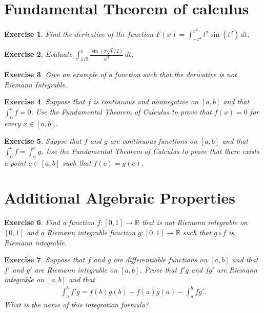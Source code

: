 \documentclass[12pt]{article}
\newcommand{\bR}{\mathbb{R}}
\newcommand{\ra}{\rightarrow}
\theoremstyle{plain}
\newtheorem{exer}{\textbf{Exercise}}}
\theoremstyle{plain}
\theoremstyle{plain}
\theoremstyle{plain}
\begin{document}
\section{Fundamental Theorem of calculus}
\begin{exer}
Find the derivative of the function $F(x) =\int_{-x^4}^{x^2} t^2 \sin (t^2) \, dt$.
\end{exer}

\begin{exer}
Evaluate $\int_{1/9}^1 \frac{\sin (\pi \sqrt{t}/2 )}{\sqrt{t}} \, dt$.
\end{exer}
	
\begin{exer}
Give an example of a function such that the derivative is not Riemann Integrable.
\end{exer}

\begin{exer}
Suppose that $f$ is continuous and nonnegative on $[a, b]$ and that $\int_a^b f = 0$. Use the Fundamental Theorem of Calculus to prove that $f(x) = 0$ for every $x \in [a, b]$.
\end{exer}

\begin{exer}
Suppse that $f$ and $g$ are continuous functions on $[a, b]$ and that $\int_a^b f = \int_a^b g$. Use the Fundamental Theorem of Calculus to prove that there exists a point $c \in [a, b]$ such that $f(c) = g(c)$.
\end{exer}

\section{Additional Algebraic Properties}
\begin{exer}
Find a function $f : [0, 1] \ra \bR$ that is not Riemann integrable on $[0, 1]$ and a Riemann integrable function $g : [0, 1] \ra \bR$ such that $g \circ f$ is Riemann integrable.
\end{exer}

\begin{exer}
Suppose that $f$ and $g$ are differentiable functions on $[a, b]$ and that $f'$ and $g'$ are Riemann integrable on $[a, b]$. Prove that $f'g$ and $f g'$ are Riemann integrable on $[a, b]$ and that
	\begin{align*}
	\int_a^b f' g = f(b) g(b) - f(a) g(a) - \int_a^b f g' .
	\end{align*}
What is the name of this integration formula?
\end{exer}
\end{document}
